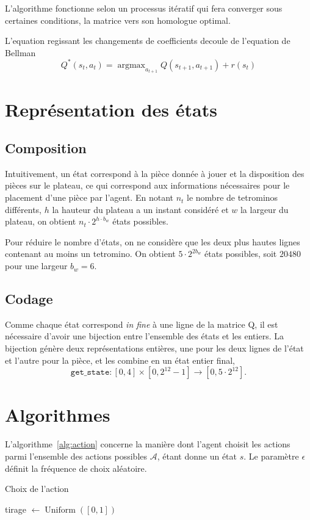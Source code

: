 \documentclass{report}
\DeclareMathOperator{\argmax}{argmax}
\DeclareMathOperator{\uniform}{Uniform}
\begin{document}
L'algorithme fonctionne selon un processus itératif qui fera converger sous
certaines conditions, la matrice vers son homologue optimal.

L'equation regissant les changements de coefficients decoule de l'equation de
Bellman\cite{mengin}
\[
  Q^*(s_t, a_t) = \argmax_{a_{t+1}}Q(s_{t+1}, a_{t+1}) + r(s_t)
\]

\section{Représentation des états}

\subsection{Composition}
Intuitivement, un état correspond à la pièce donnée à jouer et la disposition
des pièces sur le plateau, ce qui correspond aux informations nécessaires pour
le placement d'une pièce par l'agent. En notant \(n_t\) le nombre de tetrominos
différents, \( h \) la hauteur du plateau a un instant considéré  et \(w\) la
largeur du plateau, on obtient \(n_t \cdot 2^{h \cdot b_w}\) états possibles.

Pour réduire le nombre d'états, on ne considère que les deux plus hautes lignes
contenant au moins un tetromino. On obtient \(5\cdot 2^{2 b_w}\) états
possibles, soit \(20480\) pour une largeur \( b_w = 6 \).

\subsection{Codage}
Comme chaque état correspond \textit{in fine} à une ligne de la matrice Q, il est
nécessaire d'avoir une bijection entre l'ensemble des états et les entiers. La
bijection génère deux représentations entières, une pour les deux lignes de
l'état et l'autre pour la pièce, et les combine en un état entier final,
\[
  \texttt{get\_state}\colon [0,4]\times [0, 2^{12} - 1] \to [0, 5\cdot 2^{12}].
\]


\section{Algorithmes}\label{sec:algorithmes}

L'algorithme~\ref{alg:action} concerne la manière dont l'agent choisit les
actions parmi l'ensemble des actions possibles \(\mathcal{A}\), étant donne un
état \(s\). Le paramètre \(\epsilon\) définit la fréquence de choix aléatoire.
\begin{algorithm}
  \caption{Choix de l'action}\label{alg:action}
  \begin{algorithmic}
    [1]
    \State{} tirage \(\gets \uniform([0, 1])\)
    \Return{\(\argmax_{a\in\mathcal{A}} Q(s, a)\)}
    \Else{}
    \Return{\(\uniform(\mathcal{A})\)}
    \EndIf{}
    \EndProcedure{}
  \end{algorithmic}
\end{algorithm}
\end{document}
